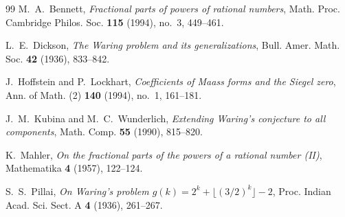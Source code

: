 \documentclass[11pt,reqno]{amsart}
\theoremstyle{definition}
\numberwithin{equation}{section}
\begin{document}
\begin{thebibliography}{99}
M.~A.~Bennett, \emph{Fractional parts of powers of rational numbers}, Math. Proc. Cambridge Philos. Soc. \textbf{115} (1994), no.~3, 449--461.

L.~E.~Dickson, \emph{The Waring problem and its generalizations}, Bull. Amer. Math. Soc. \textbf{42} (1936), 833--842.

J.~Hoffstein and P.~Lockhart, \emph{Coefficients of Maass forms and the Siegel zero}, Ann. of Math. (2) \textbf{140} (1994), no.~1, 161--181.

J.~M.~Kubina and M.~C.~Wunderlich, \emph{Extending Waring's conjecture to all components}, Math. Comp. \textbf{55} (1990), 815--820.

K.~Mahler, \emph{On the fractional parts of the powers of a rational number (II)}, Mathematika \textbf{4} (1957), 122--124.

S.~S.~Pillai, \emph{On Waring's problem $g(k) = 2^k + \lfloor(3/2)^k\rfloor - 2$}, Proc. Indian Acad. Sci. Sect. A \textbf{4} (1936), 261--267.
\end{thebibliography}
\end{document}
